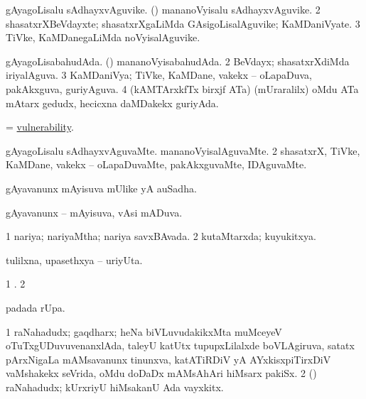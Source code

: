 \bentry 
{} 
\gl{\nA}
\expl{}
\bmng
\bnum
{} 
\banum
{} gAyagoLisalu sAdhayxvAguvike. 
 (\rUpa) mananoVyisalu sAdhayxvAguvike. 
\eanum
\numie
\num{2} shasatxrXBeVdayxte; shasatxrXgaLiMda GAsigoLisalAguvike; KaMDaniVyate. 
\num{3} TiVke, KaMDanegaLiMda noVyisalAguvike. 
\enum
\emng
\eentry

\bentry
{} 
\gl{\gu}
\expl{}
\bmng
\bnum
{} 
\banum
{} gAyagoLisabahudAda. 
 (\rUpa) mananoVyisabahudAda. 
\eanum
\numie
\num{2} BeVdayx; shasatxrXdiMda iriyalAguva. 
\num{3} KaMDaniVya; TiVke, KaMDane, \mo vakekx -- oLapaDuva, pakAkxguva, guriyAguva. 
\num{4} (kAMTArxkfTx birxjf ATa) (mUraralilx) oMdu ATa mAtarx gedudx, hecicxna daMDakekx guriyAda. 
\enum
\emng
\eentry

\bentry 
{} 
\gl{\nA}
\expl{}
\bmng
 = \hyperlink{vulnerability}{vulnerability}. 
\emng
\eentry

\bentry
{} 
\gl{\kirxvi}
\expl{}
\bmng
\bnum
{} 
\banum
{} gAyagoLisalu sAdhayxvAguvaMte. 
 mananoVyisalAguvaMte. 
\eanum
\numie
\num{2} shasatxrX, TiVke, KaMDane, \mo vakekx -- oLapaDuvaMte, pakAkxguvaMte, IDAguvaMte. 
\enum
\emng
\eentry

\bentry 
{} 
\gl{\nA}
\bmng
 gAyavanunx mAyisuva mUlike yA auSadha. 
\emng
\eentry

\bentry
{} 
\gl{\gu}
\expl{}
\bmng
 gAyavanunx -- mAyisuva, vAsi mADuva. 
\emng
\eentry

\bentry
{} 
\gl{\gu}
\expl{}
\bmng
\bnum
\num{1} nariya; nariyaMtha; nariya savxBAvada. 
\num{2} kutaMtarxda; kuyukitxya. 
\enum
\emng
\eentry 

\bentry
{} 
\gl{\nA}
\expl{}
\bmng
 tulilxna, upasethxya -- uriyUta. 
\emng
\eentry

\bentry
{}
\gl{\saMkiSx}
\expl{}
\bmng
\bnum
\num{1} . 
\num{2}  
\enum
\emng
\eentry

\bentry
{} 
\gl{\kirx}
\expl{}
\bmng
  padada \vakaq rUpa. 
\emng
\eentry

\bentry
{} 
\gl{\nA}
\bmng
\bnum
\num{1} raNahadudx; gaqdharx; heNa biVLuvudakikxMta muMceyeV oTuTxgUDuvuvenanxlAda, taleyU katUtx tupupxLilalxde boVLAgiruva, satatx pArxNigaLa mAMsavanunx tinunxva, katATiRDiV yA AYxkisxpiTirxDiV vaMshakekx seVrida, oMdu doDaDx mAMsAhAri hiMsarx pakiSx.  
\num{2} (\rUpa) raNahadudx; kUrxriyU hiMsakanU Ada vayxkitx. 
\enum
\emng
\eentry


